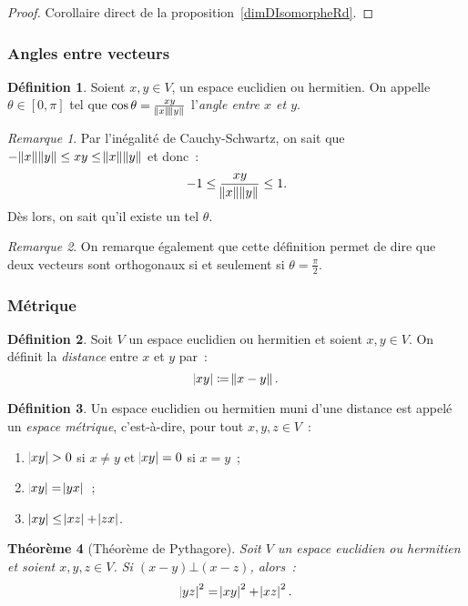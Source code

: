 \documentclass{article}
\newtheorem{thm}{Théorème}[section]
\theoremstyle{definition}
\newtheorem{déf}[thm]{Définition}
\theoremstyle{remark}
\newtheorem*{rmq}{Remarque}
\begin{document}
		\begin{proof} Corollaire direct de la proposition~\ref{dimDIsomorpheRd}.
		\end{proof}

		\subsubsection{Angles entre vecteurs}
		\begin{déf} Soient $x, y \in V$, un espace euclidien ou hermitien. On appelle $\theta \in [0, \pi]$ tel que $\cos \theta = \frac {xy}{\norm x\norm y}$
		l'\emph{angle entre $x$ et $y$}.
		\end{déf}

		\begin{rmq} Par l'inégalité de Cauchy-Schwartz, on sait que $-\norm x\norm y \leq xy \leq \norm x\norm y$ et donc~:
		\[-1 \leq \frac {xy}{\norm x\norm y} \leq 1.\]
		Dès lors, on sait qu'il existe un tel $\theta$.
		\end{rmq}

		\begin{rmq} On remarque également que cette définition permet de dire que deux vecteurs sont orthogonaux si et seulement si $\theta = \frac \pi 2$.
		\end{rmq}

		\subsubsection{Métrique}
		\begin{déf} Soit $V$ un espace euclidien ou hermitien et soient $x, y \in V$. On définit la \emph{distance} entre $x$ et $y$ par~:
		\[\abs {xy} \coloneqq \norm {x-y}.\]
		\end{déf}

		\begin{déf} Un espace euclidien ou hermitien muni d'une distance est appelé un \emph{espace métrique}, c'est-à-dire, pour tout $x, y, z \in V$~:
		\begin{enumerate}
			\item $\abs {xy} > 0$ si $x \neq y$ et $\abs {xy} = 0$ si $x=y$~;
			\item $\abs {xy} = \abs {yx}$~;
			\item $\abs {xy} \leq \abs {xz} + \abs {zx}$.
		\end{enumerate}
		\end{déf}

		\begin{thm}[Théorème de Pythagore] Soit $V$ un espace euclidien ou hermitien et soient $x, y, z \in V$. Si $(x-y) \bot (x-z)$, alors~:
		\[\abs {yz}^2 = \abs {xy}^2 + \abs {xz}^2.\]
		\end{thm}
\end{document}
